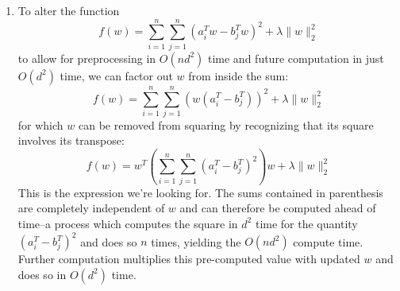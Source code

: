 \documentclass[12pt]{article}
\begin{document}
\begin{enumerate}[label=(\alph*)]
	\item To alter the function
		\[
			f(w) =
			\sum_{i=1}^n\sum_{j=1}^n (a_i^Tw - b_j^Tw)^2 + \lambda \lVert w \rVert_2^2
		\]
		to allow for preprocessing in \(O(nd^2)\) time and future computation in
		just \(O(d^2)\) time, we can factor out \(w\) from inside the sum:
		\[
			f(w) =
			\sum_{i=1}^n\sum_{j=1}^n (w(a_i^T - b_j^T))^2 + \lambda \lVert w \rVert_2^2
		\]
		for which \(w\) can be removed from squaring by recognizing that its square
		involves its transpose:
		\[
			f(w) =
			w^T\left(\sum_{i=1}^n\sum_{j=1}^n (a_i^T - b_j^T)^2\right)w
			+ \lambda \lVert w \rVert_2^2
		\]
		This is the expression we're looking for. The sums contained in parenthesis
		are completely independent of \(w\) and can therefore be computed ahead of
		time--a process which computes the square in \(d^2\) time for the quantity
		\((a_i^T - b_j^T)^2\) and does so \(n\) times, yielding the \(O(nd^2)\)
		compute time. Further computation multiplies this pre-computed value
		with updated \(w\) and does so in \(O(d^2)\) time.

\end{enumerate}
\end{document}
